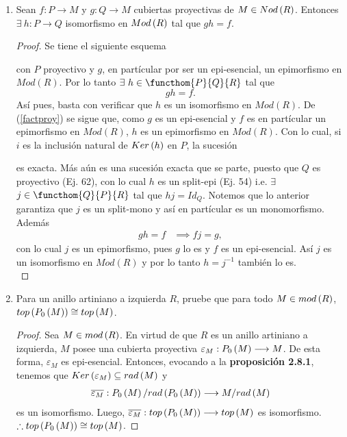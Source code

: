 \documentclass{article}
\begin{document}
\begin{enumerate}[label=\textbf{Ej \arabic*.}]
		\item Sean $f:P\to M$ y $g:Q\to M$ 	cubiertas proyectivas de $M\in Nod\left(R\right)$. Entonces $\exists\ h:P\to Q$ isomorfismo en $Mod\left(R\right)$ tal que $gh=f$.
		\begin{proof}
			Se tiene el siguiente esquema
			\begin{center}
			\end{center}
			con $P$ proyectivo y $g$, en partícular por ser un epi-esencial, un epimorfismo en $Mod(R)$. Por lo tanto $\exists\ h\in\functhom{P}{Q}{R}$ tal que \begin{equation*}\tag{*}\label{factproy}
				gh=f.
			\end{equation*} Así pues, basta con verificar que $h$ es un isomorfismo en $Mod(R)$. De (\ref{factproy}) se sigue que, como $g$ es un epi-esencial y $f$ es en  partícular un epimorfismo en $Mod(R)$,  $h$ es un epimorfismo en $Mod(R)$. Con lo cual, si $i$ es la inclusión natural de $Ker\left(h\right)$ en $P$, la sucesión
			\begin{center}
			\end{center}
			es exacta. Más aún es una sucesión exacta que se parte, puesto que $Q$ es proyectivo (Ej. 62), con lo cual $h$ es un split-epi (Ej. 54) i.e. $\exists$ $j\in\functhom{Q}{P}{R}$ tal que $hj=Id_Q$. Notemos que lo anterior garantiza que $j$ es un split-mono y así en partícular es un monomorfismo. Además
			\begin{align*}
				gh=f&\implies fj=g,
			\end{align*}
			con lo cual $j$ es un epimorfismo, pues $g$ lo es y $f$ es un epi-esencial. Así $j$ es un isomorfismo en $Mod(R)$ y por lo tanto $h=j^{-1}$ también lo es.\\
		\end{proof}
		
		\item Para un anillo artiniano a izquierda $R$, pruebe que para todo $M \in mod\left(R\right)$, $top\left(P_{0}\left(M\right)\right) \cong top\left(M\right)$.
		\begin{proof}
			Sea $M \in mod\left(R\right)$. En virtud de que $R$ es un anillo artiniano a izquierda, $M$ posee una cubierta proyectiva $\varepsilon_{M}:P_{0}\left(M\right)\longrightarrow M$. De esta forma, $\varepsilon_{M}$ es epi-esencial. Entonces, evocando a la \textbf{proposición 2.8.1}, tenemos que $Ker\left(\varepsilon_{M}\right) \subseteq rad\left(M\right)$ y 
			\begin{align*}
				\overline{\varepsilon_{M}}:P_{0}\left(M\right)/rad\left(P_{0}\left(M\right)\right)\longrightarrow M/rad\left(M\right)
			\end{align*}
			es un isomorfismo. Luego, $\overline{\varepsilon_{M}}:top\left(P_{0}\left(M\right)\right)\longrightarrow top\left(M\right)$ es isomorfismo. $\therefore top\left(P_{0}\left(M\right)\right) \cong top \left(M\right)$.
		\end{proof}
		

\end{enumerate}
\end{document}

